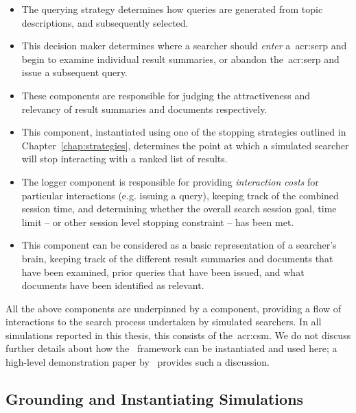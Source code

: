 \begin{itemize}
    \item{ The querying strategy determines how queries are generated from topic descriptions, and subsequently selected.}
    \item{ This decision maker determines where a searcher should \emph{enter} a~\gls{acr:serp} and begin to examine individual result summaries, or abandon the~\gls{acr:serp} and issue a subsequent query.}
    \item{ These components are responsible for judging the attractiveness and relevancy of result summaries and documents respectively.}
    \item{ This component, instantiated using one of the stopping strategies outlined in Chapter~\ref{chap:strategies}, determines the point at which a simulated searcher will stop interacting with a ranked list of results.}
    \item{ The logger component is responsible for providing \emph{interaction costs} for particular interactions (e.g. issuing a query), keeping track of the combined session time, and determining whether the overall search session goal, time limit -- or other session level stopping constraint -- has been met.}
    \item{ This component can be considered as a basic representation of a searcher's brain, keeping track of the different result summaries and documents that have been examined, prior queries that have been issued, and what documents have been identified as relevant.}
\end{itemize}

All the above components are underpinned by a  component, providing a flow of interactions to the search process undertaken by simulated searchers. In all simulations reported in this thesis, this consists of the~\gls{acr:csm}. We do not discuss further details about how the \simiir~framework can be instantiated and used here; a high-level demonstration paper by~\cite{maxwell2016simiir} provides such a discussion.

\subsection{Grounding and Instantiating Simulations}\label{sec:method:simulation:grounding}


